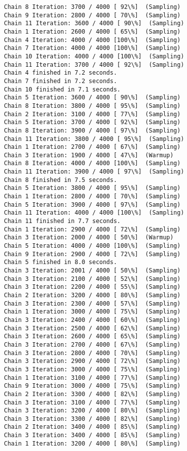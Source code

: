 \documentclass[11pt]{article}
\begin{document}
\begin{Verbatim}[commandchars=\\\{\}]
Chain 8 Iteration: 3700 / 4000 [ 92\%]  (Sampling)
Chain 9 Iteration: 2800 / 4000 [ 70\%]  (Sampling)
Chain 11 Iteration: 3600 / 4000 [ 90\%]  (Sampling)
Chain 1 Iteration: 2600 / 4000 [ 65\%]  (Sampling)
Chain 4 Iteration: 4000 / 4000 [100\%]  (Sampling)
Chain 7 Iteration: 4000 / 4000 [100\%]  (Sampling)
Chain 10 Iteration: 4000 / 4000 [100\%]  (Sampling)
Chain 11 Iteration: 3700 / 4000 [ 92\%]  (Sampling)
Chain 4 finished in 7.2 seconds.
Chain 7 finished in 7.2 seconds.
Chain 10 finished in 7.1 seconds.
Chain 5 Iteration: 3600 / 4000 [ 90\%]  (Sampling)
Chain 8 Iteration: 3800 / 4000 [ 95\%]  (Sampling)
Chain 2 Iteration: 3100 / 4000 [ 77\%]  (Sampling)
Chain 5 Iteration: 3700 / 4000 [ 92\%]  (Sampling)
Chain 8 Iteration: 3900 / 4000 [ 97\%]  (Sampling)
Chain 11 Iteration: 3800 / 4000 [ 95\%]  (Sampling)
Chain 1 Iteration: 2700 / 4000 [ 67\%]  (Sampling)
Chain 3 Iteration: 1900 / 4000 [ 47\%]  (Warmup)
Chain 8 Iteration: 4000 / 4000 [100\%]  (Sampling)
Chain 11 Iteration: 3900 / 4000 [ 97\%]  (Sampling)
Chain 8 finished in 7.5 seconds.
Chain 5 Iteration: 3800 / 4000 [ 95\%]  (Sampling)
Chain 1 Iteration: 2800 / 4000 [ 70\%]  (Sampling)
Chain 5 Iteration: 3900 / 4000 [ 97\%]  (Sampling)
Chain 11 Iteration: 4000 / 4000 [100\%]  (Sampling)
Chain 11 finished in 7.7 seconds.
Chain 1 Iteration: 2900 / 4000 [ 72\%]  (Sampling)
Chain 3 Iteration: 2000 / 4000 [ 50\%]  (Warmup)
Chain 5 Iteration: 4000 / 4000 [100\%]  (Sampling)
Chain 9 Iteration: 2900 / 4000 [ 72\%]  (Sampling)
Chain 5 finished in 8.0 seconds.
Chain 3 Iteration: 2001 / 4000 [ 50\%]  (Sampling)
Chain 3 Iteration: 2100 / 4000 [ 52\%]  (Sampling)
Chain 3 Iteration: 2200 / 4000 [ 55\%]  (Sampling)
Chain 2 Iteration: 3200 / 4000 [ 80\%]  (Sampling)
Chain 3 Iteration: 2300 / 4000 [ 57\%]  (Sampling)
Chain 1 Iteration: 3000 / 4000 [ 75\%]  (Sampling)
Chain 3 Iteration: 2400 / 4000 [ 60\%]  (Sampling)
Chain 3 Iteration: 2500 / 4000 [ 62\%]  (Sampling)
Chain 3 Iteration: 2600 / 4000 [ 65\%]  (Sampling)
Chain 3 Iteration: 2700 / 4000 [ 67\%]  (Sampling)
Chain 3 Iteration: 2800 / 4000 [ 70\%]  (Sampling)
Chain 3 Iteration: 2900 / 4000 [ 72\%]  (Sampling)
Chain 3 Iteration: 3000 / 4000 [ 75\%]  (Sampling)
Chain 1 Iteration: 3100 / 4000 [ 77\%]  (Sampling)
Chain 9 Iteration: 3000 / 4000 [ 75\%]  (Sampling)
Chain 2 Iteration: 3300 / 4000 [ 82\%]  (Sampling)
Chain 3 Iteration: 3100 / 4000 [ 77\%]  (Sampling)
Chain 3 Iteration: 3200 / 4000 [ 80\%]  (Sampling)
Chain 3 Iteration: 3300 / 4000 [ 82\%]  (Sampling)
Chain 2 Iteration: 3400 / 4000 [ 85\%]  (Sampling)
Chain 3 Iteration: 3400 / 4000 [ 85\%]  (Sampling)
Chain 1 Iteration: 3200 / 4000 [ 80\%]  (Sampling)

\end{Verbatim}
\end{document}

